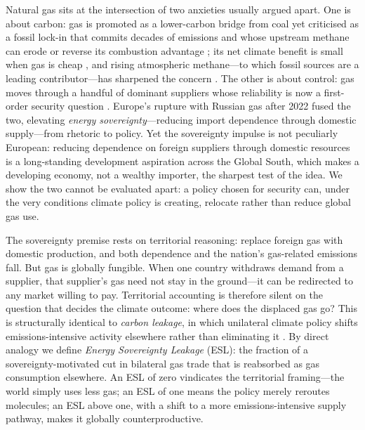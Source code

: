 \documentclass[sn-nature]{sn-jnl}
\theoremstyle{thmstyleone}%
\theoremstyle{thmstyletwo}%
\theoremstyle{thmstylethree}%
\begin{document}
Natural gas sits at the intersection of two anxieties usually argued apart. One
is about carbon: gas is promoted as a lower-carbon bridge from coal yet
criticised as a fossil lock-in that commits decades of emissions \citep{Tong2019}
and whose upstream methane can erode or reverse its combustion advantage
\citep{Kemfert2022, GURSAN2021, Alvarez2018, Howarth2011, Howarth2014, Newell2014};
its net climate benefit is small when gas is cheap \citep{McJeon2014}, and rising
atmospheric methane---to which fossil sources are a leading
contributor---has sharpened the concern \citep{Saunois2020, Jackson2020}. The
other is about control: gas moves through a handful of dominant suppliers whose
reliability is now a first-order security question \citep{Bordoff2022}. Europe's
rupture with Russian gas after 2022 fused the two, elevating \emph{energy
sovereignty}---reducing import dependence through domestic supply---from rhetoric
to policy. Yet the sovereignty impulse is not peculiarly European: reducing
dependence on foreign suppliers through domestic resources is a long-standing
development aspiration across the Global South, which makes a developing economy,
not a wealthy importer, the sharpest test of the idea. We show the two cannot be
evaluated apart: a policy chosen for security can, under the very conditions
climate policy is creating, relocate rather than reduce global gas use.

The sovereignty premise rests on territorial reasoning: replace foreign gas
with domestic production, and both dependence and the nation's gas-related
emissions fall. But gas is globally fungible. When one country withdraws demand
from a supplier, that supplier's gas need not stay in the ground---it can be
redirected to any market willing to pay. Territorial accounting is therefore
silent on the question that decides the climate outcome: where does the
displaced gas go? This is structurally identical to \emph{carbon leakage}, in
which unilateral climate policy shifts emissions-intensive activity elsewhere
rather than eliminating it
\citep{carbonleakage, Aichele2015, FischerFox2012, Bohringer2012, Jakob2021}.
By direct analogy we define \emph{Energy Sovereignty Leakage} (ESL): the
fraction of a sovereignty-motivated cut in bilateral gas trade that is
reabsorbed as gas consumption elsewhere. An ESL of zero vindicates the
territorial framing---the world simply uses less gas; an ESL of one means the
policy merely reroutes molecules; an ESL above one, with a shift to a more
emissions-intensive supply pathway, makes it globally counterproductive.
\end{document}
